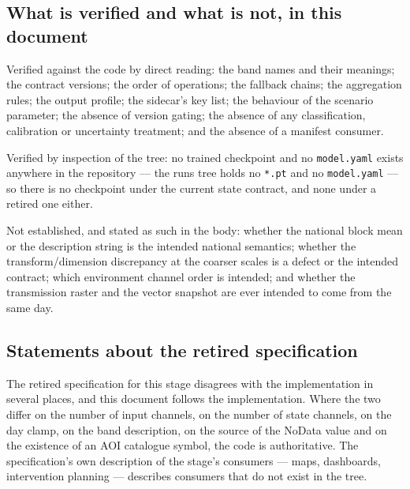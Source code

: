 \documentclass[11pt,a4paper]{article}
\newcommand{\code}[1]{\texttt{#1}}
\begin{document}
\subsection{What is verified and what is not, in this document}

Verified against the code by direct reading: the band names and their
meanings; the contract versions; the order of operations; the fallback
chains; the aggregation rules; the output profile; the sidecar's key list;
the behaviour of the scenario parameter; the absence of version gating; the
absence of any classification, calibration or uncertainty treatment; and the
absence of a manifest consumer.

Verified by inspection of the tree: no trained checkpoint and no
\code{model.yaml} exists anywhere in the repository --- the runs tree holds
no \code{*.pt} and no \code{model.yaml} --- so there is no checkpoint under
the current state contract, and none under a retired one either.

Not established, and stated as such in the body: whether the national block
mean or the description string is the intended national semantics; whether
the transform/dimension discrepancy at the coarser scales is a defect or the
intended contract; which environment channel order is intended; and whether
the transmission raster and the vector snapshot are ever intended to come
from the same day.

\subsection{Statements about the retired specification}

The retired specification for this stage disagrees with the implementation in
several places, and this document follows the implementation. Where the two
differ on the number of input channels, on the number of state channels, on
the day clamp, on the band description, on the source of the NoData value and
on the existence of an AOI catalogue symbol, the code is authoritative. The
specification's own description of the stage's consumers --- maps,
dashboards, intervention planning --- describes consumers that do not exist
in the tree.
\end{document}
